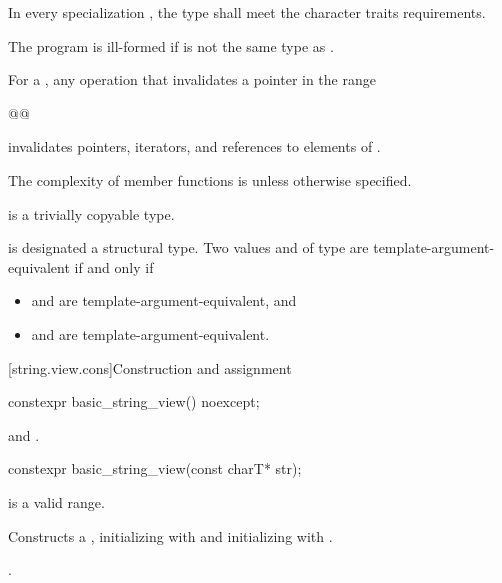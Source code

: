 \pnum
In every specialization , the type  shall meet the character traits requirements.
\begin{note}
The program is ill-formed if  is not the same type as .
\end{note}

\pnum
For a ,
any operation that invalidates a pointer
in the range
\begin{codeblock}
@@
\end{codeblock}
invalidates pointers, iterators, and references
to elements of .

\pnum
The complexity of  member functions is 
unless otherwise specified.

\pnum
{} is
a trivially copyable type.

\pnum
{}
is designated a structural type.
Two values  and  of type 
are template-argument-equivalent if and only if
\begin{itemize}
\item
{} and  are template-argument-equivalent, and
\item
{} and  are template-argument-equivalent.
\end{itemize}

[string.view.cons]{Construction and assignment}

%
\begin{itemdecl}
constexpr basic_string_view() noexcept;
\end{itemdecl}

\begin{itemdescr}
\pnum
\ensures
{} and .
\end{itemdescr}

%
\begin{itemdecl}
constexpr basic_string_view(const charT* str);
\end{itemdecl}

\begin{itemdescr}
\pnum
\expects
{} is a valid range.

\pnum
\effects
Constructs a , initializing  with 
and initializing  with .

\pnum
\complexity
{}.
\end{itemdescr}

